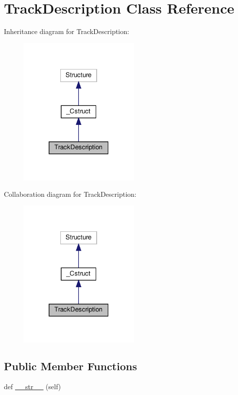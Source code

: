 \hypertarget{classvlc_1_1_track_description}{}\section{Track\+Description Class Reference}
\label{classvlc_1_1_track_description}


Inheritance diagram for Track\+Description\+:
\nopagebreak
\begin{figure}[H]
\begin{center}
\leavevmode
\includegraphics[width=171pt]{classvlc_1_1_track_description__inherit__graph}
\end{center}
\end{figure}


Collaboration diagram for Track\+Description\+:
\nopagebreak
\begin{figure}[H]
\begin{center}
\leavevmode
\includegraphics[width=171pt]{classvlc_1_1_track_description__coll__graph}
\end{center}
\end{figure}
\subsection*{Public Member Functions}
\begin{DoxyCompactItemize}
\item 
def \hyperlink{classvlc_1_1_track_description_a23e8041ce1015febe4fdace3225714f9}{\+\_\+\+\_\+str\+\_\+\+\_\+} (self)
\end{DoxyCompactItemize}



